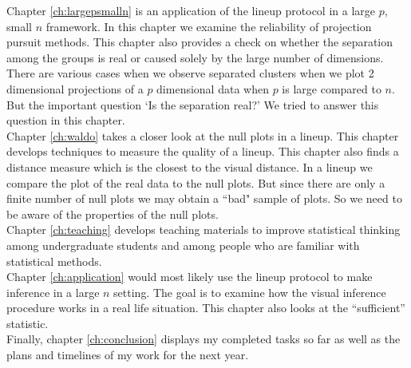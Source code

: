 Chapter \ref{ch:largepsmalln} is an application of the lineup protocol in a large $p$, small $n$ framework. In this chapter we examine the reliability of projection pursuit methods. This chapter also provides a check on whether the separation among the groups is real or caused solely by the large number of dimensions. There are various cases when we observe separated clusters when we plot 2 dimensional projections of a $p$ dimensional data when $p$ is large compared to $n$. But the important question `Is the separation real?' We tried to answer this question in this chapter. \\

Chapter \ref{ch:waldo} takes a closer look at the null plots in a lineup. This chapter develops techniques to measure the quality of a lineup. This chapter also finds a distance measure which is the closest to the visual distance. In a lineup we compare the plot of the real data to the null plots. But since there are only a finite number of null plots we may obtain a ``bad" sample of plots. So we need to be aware of the properties of the null plots. \\

Chapter \ref{ch:teaching} develops teaching materials to improve statistical thinking among undergraduate students and among people who are familiar with statistical methods. \\ 

Chapter \ref{ch:application} would most likely use the lineup protocol to make inference in a large $n$ setting. The goal is to examine how the visual inference procedure works in a real life situation. This chapter also looks at the ``sufficient'' statistic. \\

Finally, chapter \ref{ch:conclusion} displays my completed tasks so far as well as the plans and timelines of my work for the next year. 

